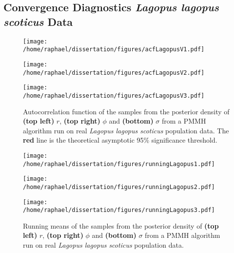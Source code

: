 \documentclass[12pt]{article}
\begin{document}
\begin{appendices}
	\subsection{Convergence Diagnostics \emph{Lagopus lagopus scoticus} Data}
	\begin{figure}[htb]
		\centering
		\begin{minipage}{0.5\textwidth}
			\centering
			\texttt{[image: /home/raphael/dissertation/figures/acfLagopusV1.pdf]}
		\end{minipage}
		\begin{minipage}{0.5\textwidth}
			\centering
			\texttt{[image: /home/raphael/dissertation/figures/acfLagopusV2.pdf]}
		\end{minipage}
		\begin{minipage}{0.5\textwidth}
			\centering
			\texttt{[image: /home/raphael/dissertation/figures/acfLagopusV3.pdf]}
		\end{minipage}
		\caption[Autocorrelation functions of the samples from a PMMH algorithm run on real \emph{Lagopus lagopus scoticus} population data]{Autocorrelation function of the samples from the posterior density of \textbf{(top left)} $r$, \textbf{(top right)} $\phi$ and \textbf{(bottom)} $\sigma$ from a PMMH algorithm run on real \emph{Lagopus lagopus scoticus} population data. The \textbf{red} line is the theoretical asymptotic 95\% significance threshold.}
		\label{fig:acfLagopus}
	\end{figure}

\clearpage
\thispagestyle{empty}
\restoregeometry
	\begin{figure}[htb]
		\centering
		\begin{minipage}{0.6\textwidth}
			\centering
			\texttt{[image: /home/raphael/dissertation/figures/runningLagopus1.pdf]}
		\end{minipage}
		\begin{minipage}{0.6\textwidth}
			\centering
			\texttt{[image: /home/raphael/dissertation/figures/runningLagopus2.pdf]}
		\end{minipage}
		\begin{minipage}{0.6\textwidth}
			\centering
			\texttt{[image: /home/raphael/dissertation/figures/runningLagopus3.pdf]}
		\end{minipage}
		\caption[Running means of the samples from a PMMH algorithm run on real \emph{Lagopus lagopus scoticus} population data]{Running means of the samples from the posterior density of \textbf{(top left)} $r$, \textbf{(top right)} $\phi$ and \textbf{(bottom)} $\sigma$ from a PMMH algorithm run on real \emph{Lagopus lagopus scoticus} population data.}
		\label{fig:rmLagopus}
	\end{figure}
	

\end{appendices}
\end{document}
